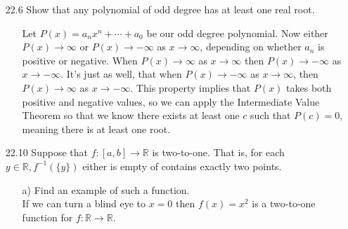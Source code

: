 \documentclass[12pt]{article}
\begin{document}
\begin{enumerate}
\item[22.6] Show that any polynomial of odd degree has at least one real root.
\begin{enumerate}
\item[] Let $P(x) = a_nx^n + \cdots + a_0$ be our odd degree polynomial.
Now either $P(x) \rightarrow \infty$ or $P(x) \rightarrow -\infty$ as
$x \rightarrow \infty$, depending on whether $a_n$ is positive or negative. 
When $P(x) \rightarrow \infty$ as $x \rightarrow \infty$ then
$P(x) \rightarrow -\infty$ as $x \rightarrow -\infty$. It's just as well, that
when $P(x) \rightarrow -\infty$ as $x \rightarrow \infty$, then $P(x) \to \infty$
as $x \rightarrow -\infty$. This property implies that $P(x)$ takes both
positive and negative values, so we can apply the Intermediate Value Theorem
so that we know there exists at least one $c$ such that $P(c) = 0$, meaning
there is at least one root. 
\end{enumerate}

\item[22.10] Suppose that $f: [a, b] \rightarrow \mathbb{R}$ is two-to-one. That is, for each $y \in \mathbb{R}, f^{-1}(\{y\})$ either is empty of contains exactly two points.
\begin{enumerate}
\item[a)] Find an example of such a function. \\
If we can turn a blind eye to $x = 0$ then $f(x) = x^2$ is a 
two-to-one function for $f: \mathbb{R} \rightarrow \mathbb{R}$.
\end{enumerate}


\end{enumerate}
\end{document}

